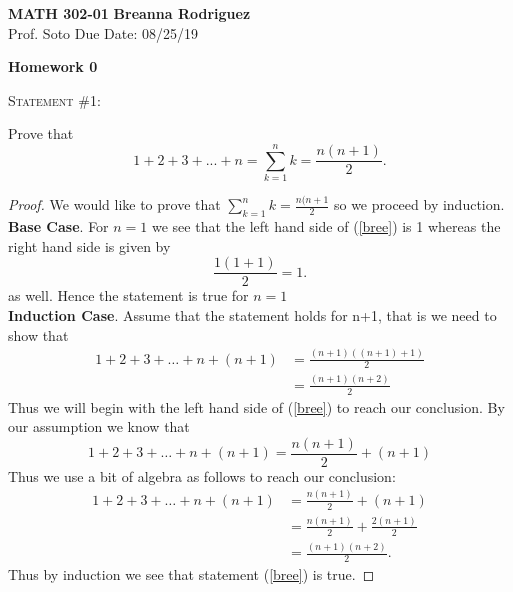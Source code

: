 \documentclass[12pt]{article}
\newenvironment{statement}[1]
{\begin{mdframed}[linewidth=0.6pt]
        \textsc{Statement #1:}

}
    {\end{mdframed}}
\begin{document}
\noindent
\textbf{MATH 302-01} \hfill \textbf{Breanna Rodriguez} \\
\normalsize Prof. Soto \hfill Due Date: 08/25/19 \\

\begin{center}
\textbf{Homework 0}
\end{center}

\begin{statement}{\#1}
Prove that    
\begin{equation}
\label{bree}
    1 + 2 + 3+...+ n = \sum_{k=1}^n k = \frac{n(n+1)}{2}.
\end{equation}
\end{statement}

\begin{proof}
We would like to prove that $ \sum_{k=1}^n k = \frac{n(n+1}{2}$ so we proceed by induction. \\

\textbf{Base Case}. For $n = 1$ we see that the left hand side of (\ref{bree}) is 1 whereas the right hand side is given by 
$$ \frac{1(1+1)}{2}= 1. $$
as well. Hence the statement is true for $n =1$ \\

\textbf{Induction Case}. Assume that the statement holds for n+1, that is we need to show that
\begin{align*}
 1 + 2 + 3 + \dotsc + n + (n+1) &= \frac{(n+1)((n+1)+1)}{2} \\
 & = \frac{(n+1)(n+2)}{2}
\end{align*}
Thus we will begin with the left hand side of (\ref{bree}) to reach our conclusion. By our assumption we know that 
$$ 1 + 2 + 3 + \dotsc + n + (n+1) = \frac{n(n+1)}{2} + (n+1)
$$
Thus we use a bit of algebra as follows to reach our conclusion: 
\begin{align*}
    1 + 2 + 3 + \dotsc + n+ (n+1) & = \frac{n(n+1)}{2}+ (n+1) \\ 
    & = \frac{n(n+1)}{2} + \frac{2(n+1)}{2} \\
    & = \frac{(n+1)(n+2)}{2}.
\end{align*}
Thus by induction we see that statement (\ref{bree}) is true.

\end{proof}
\end{document}
